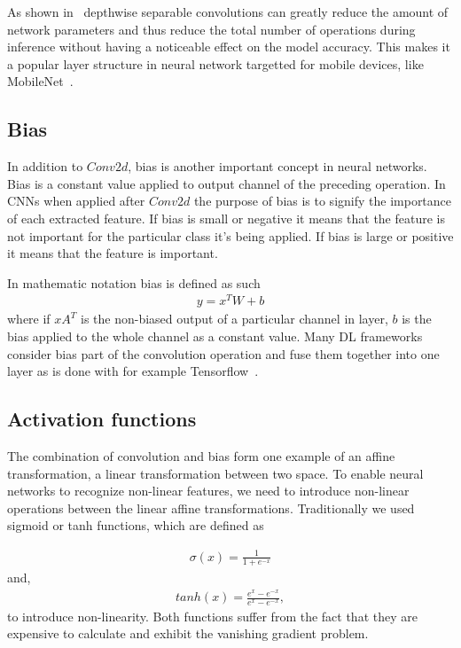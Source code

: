 \documentclass[12pt,a4paper,english
]{tunithesis}
\begin{document}
As shown in~\cite{tan_efficientnet_2020} depthwise separable convolutions can greatly reduce the amount of network parameters and thus reduce the total number of operations during inference without having a noticeable effect on the model accuracy. This makes it a popular layer structure in neural network targetted for mobile devices, like MobileNet~\cite{howard_mobilenets_2017}.


\subsection{Bias}
In addition to $Conv2d$, bias is another important concept in neural networks. Bias is a constant value applied to output channel of the preceding operation. In CNNs when applied after $Conv2d$ the purpose of bias is to signify the importance of each extracted feature. If bias is small or negative it means that the feature is not important for the particular class it's being applied. If bias is large or positive it means that the feature is important.~\cite{DeepLearningBook}

In mathematic notation bias is defined as such
\begin{align}
y = x^{T}W + b
\end{align}
where if $xA^{T}$ is the non-biased output of a particular channel in layer, $b$ is the bias applied to the whole channel as a constant value. Many DL frameworks consider bias part of the convolution operation and fuse them together into one layer as is done with for example Tensorflow~\cite{tensorflow2015-whitepaper}.

\subsection{Activation functions}
The combination of convolution and bias form one example of an affine transformation, a linear transformation between two space.
To enable neural networks to recognize non-linear features, we need to introduce non-linear operations between the linear affine transformations. Traditionally we used sigmoid or tanh functions, which are defined as

\begin{align}
\sigma(x) = \frac{1}{1+e^{-x}}
\end{align}
and,
\begin{align}
tanh(x) = \frac{e^{x}-e^{-x}}{e^{x}-e^{-x}},
\end{align}
to introduce non-linearity. Both functions suffer from the fact that they are expensive to calculate and exhibit the vanishing gradient problem.~\parencite{DeepLearningBook}
\end{document}
